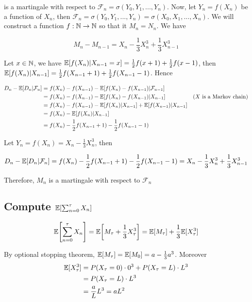 \documentclass{article}
\begin{document}
is a martingale with respect to $\mathcal{F}_n = \sigma(Y_0, Y_1, ..., Y_n)$. Now, let $Y_n = f(X_n)$ be a function of $X_n$, then $\mathcal{F}_n = \sigma(Y_0, Y_1, ..., Y_n) = \sigma(X_0, X_1, ..., X_n)$. We will construct a function $f: \mathbb{N} \to \mathbb{N}$ so that it $M_n = N_n$. We have

$$
    M_n - M_{n-1} = X_{n} - \frac{1}{3} X_n^3 + \frac{1}{3} X_{n-1}^3
$$

Let $x \in \mathbb{N}$, we have $\mathbb{E}[f(X_n) | X_{n-1} = x] = \frac{1}{2} f(x + 1) + \frac{1}{2} f(x-1)$, then $\mathbb{E}[f(X_n) | X_{n-1}] = \frac{1}{2} f(X_{n-1} + 1) + \frac{1}{2} f(X_{n-1}-1)$. Hence

\begin{align*}
    D_n - \mathbb{E}[D_n | \mathcal{F}_n]
    &= f(X_n) - f(X_{n-1}) - \mathbb{E}[f(X_n) - f(X_{n-1}) | \mathcal{F}_{n-1}] \\
    &= f(X_n) - f(X_{n-1}) - \mathbb{E}[f(X_n) - f(X_{n-1}) | X_{n-1}] &\text{($X$ is a Markov chain)}\\
    &= f(X_n) - f(X_{n-1}) - \mathbb{E}[f(X_n)| X_{n-1}] + \mathbb{E}[f(X_{n-1}) | X_{n-1}] \\
    &= f(X_n) - \mathbb{E}[f(X_n)| X_{n-1}] \\
    &= f(X_n) - \frac{1}{2} f(X_{n-1} + 1) - \frac{1}{2} f(X_{n-1}-1)
\end{align*}

Let $Y_n = f(X_n) = X_n - \frac{1}{3} X_n^3$, then 

$$
    D_n - \mathbb{E}[D_n | \mathcal{F}_n] = f(X_n) - \frac{1}{2} f(X_{n-1} + 1) - \frac{1}{2} f(X_{n-1}-1) = X_{n} - \frac{1}{3} X_n^3 + \frac{1}{3} X_{n-1}^3
$$

Therefore, $M_n$ is a martingale with respect to $\mathcal{F}_n$

\subsection{Compute $\Exp\bracket*{\sum_{n=0}^\tau X_n}$}

$$
    \Exp\bracket*{\sum_{n=0}^\tau X_n} = \Exp\bracket*{M_\tau + \frac{1}{3} X_\tau^3} = \Exp[M_\tau] + \frac{1}{3} \Exp[X_\tau^3]
$$

By optional stopping theorem, $\mathbb{E}[M_\tau] = \mathbb{E}[M_0] = a - \frac{1}{3} a^3$. Moreover
\begin{align*}
	\mathbb{E}[X_\tau^3]
	&= P(X_\tau = 0) \cdot 0^3 + P(X_\tau = L) \cdot L^3 \\
	&= P(X_\tau = L) \cdot L^3 \\
	&= \frac{a}{L}  L^3 = a L^2
\end{align*}
\end{document}
